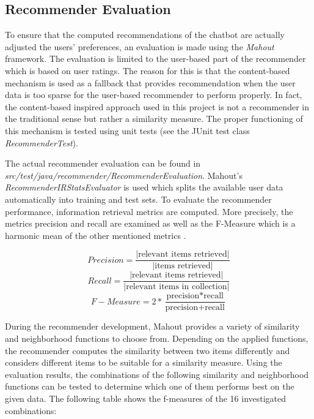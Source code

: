 \subsection{Recommender Evaluation} \label{ss:re}
To ensure that the computed recommendations of the chatbot are actually adjusted the users’ preferences, an evaluation is made using the \textit{Mahout} framework. The evaluation is limited to the user-based part of the recommender which is based on user ratings. The reason for this is that the content-based mechanism is used as a fallback that provides recommendation when the user data is too sparse for the user-based recommender to perform properly. In fact, the content-based inspired approach used in this project is not a recommender in the traditional sense but rather a similarity measure. The proper functioning of this mechanism is tested using unit tests (see the JUnit test class \textit{RecommenderTest}).

The actual recommender evaluation can be found in \textit{src/test/java/recommender/RecommenderEvaluation}. Mahout’s \textit{RecommenderIRStatsEvaluator} is used which splits the available user data automatically into training and test sets. To evaluate the recommender performance, information retrieval metrics are computed. More precisely, the metrics precision and recall are examined as well as the F-Measure which is a harmonic mean of the other mentioned metrics \cite{rijsbergen79}.

\begin{equation}
Precision=\frac{|\text{relevant items retrieved}|}{|\text{items retrieved}|}
\end{equation}
\begin{equation}
Recall=\frac{|\text{relevant items retrieved}|}{|\text{relevant items in collection}|}
\end{equation}
\begin{equation}
F-Measure=2 * \frac{\text{precision}*\text{recall}}{\text{precision}+\text{recall}}
\end{equation}

During the recommender development, Mahout provides a variety of similarity and neighborhood functions to choose from. Depending on the applied functions, the recommender computes the similarity between two items differently and considers different items to be suitable for a similarity measure. Using the evaluation results, the combinations of the following similarity and neighborhood functions can be tested to determine which one of them performs best on the given data.  The following table shows the f-measures of the 16 investigated combinations:

